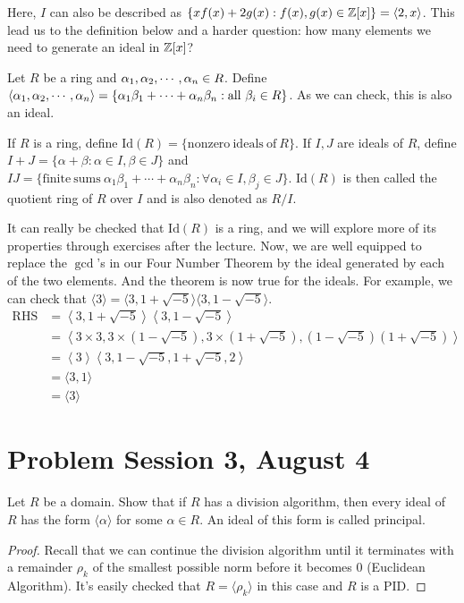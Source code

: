 \documentclass[12pt,twoside=semi,openright,numbers=noenddot]{scrbook}
\begin{document}
Here, $I$ can also be described as $\{xf(x)+2g(x):f(x), g(x)\in \mathbb Z[x]\}= \langle 2,x \rangle$. This lead us to the definition below and a harder question: how many 
elements we need to generate an ideal in $\mathbb Z[x]$?

\begin{definition}
    Let $R$ be a ring and ${\alpha}_1, {\alpha}_2, \cdots, {\alpha}_{n} \in R$. Define $\langle {\alpha}_1, {\alpha}_2, \cdots, {\alpha}_{n} \rangle = 
    \{ \alpha_1\beta_1+\cdots + \alpha_n\beta_n: \mathrm{all} \  \beta_i \in R\}$.
    As we can check, this is also an ideal.
\end{definition}

\begin{definition}
    If $R$ is a ring, define $\mathrm{Id}(R) = \{\mathrm{nonzero \ ideals \ of \ } R\}$. If $I, J$ are ideals of $R$, 
    define $I+J = \{\alpha+\beta:\alpha \in I, \beta \in J\}$ and $IJ = \{\mathrm{finite \ sums \ } \alpha_1\beta_1+\cdots+\alpha_n\beta_n: \forall \alpha_i \in I, \beta_j \in J\}$.
    $\mathrm{Id}(R)$ is then called the quotient ring of $R$ over $I$ and is also denoted as $R/I$.
\end{definition}

It can really be checked that $\mathrm{Id}(R)$ is a ring, and we will explore more of its properties through exercises after the lecture.
Now, we are well equipped to replace the $\gcd$'s in our Four Number Theorem by the ideal generated by each of the two elements. And the theorem is now true for 
the ideals. For example, we can check that $\langle 3 \rangle = \langle 3, 1+\sqrt{-5} \rangle \langle 3, 1-\sqrt{-5} \rangle$.
    \begin{align*}
        \mathrm{RHS}&= \left\langle 3, 1+\sqrt{-5} \right\rangle \left\langle 3, 1-\sqrt{-5}\right\rangle \\
        &= \left\langle 3\times 3, 3\times (1-\sqrt{-5}), 3\times(1+\sqrt{-5}), (1-\sqrt{-5})(1+\sqrt{-5})\right\rangle \\
        &= \left\langle 3\right\rangle \left\langle 3, 1-\sqrt{-5}, 1+\sqrt{-5}, 2\right\rangle \\
        &= \langle 3, 1\rangle \\
        &= \langle 3\rangle
    \end{align*}

\section{Problem Session 3, August 4}
\begin{problem}
    Let $R$ be a domain. Show that if $R$ has a division algorithm, 
    then every ideal of $R$ has the form $\langle\alpha\rangle$ for some $\alpha \in R$. An ideal of this form is called principal.
\end{problem}
    \begin{proof}
        Recall that we can continue the division algorithm until it terminates with a remainder $\rho_k$ of the smallest possible norm before it 
        becomes $0$ (Euclidean Algorithm). It's easily checked that $R = \langle \rho_k \rangle$ in this case and $R$ is a PID.
    \end{proof}
\end{document}
